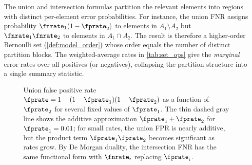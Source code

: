 \begin{remark}
\label{rem:composed_order}
The union and intersection formulas partition the relevant elements into regions with distinct per-element error probabilities.
For instance, the union FNR assigns probability $\fnrate_1(1-\fprate_2)$ to elements in $A_1 \setminus A_2$ but $\fnrate_1 \fnrate_2$ to elements in $A_1 \cap A_2$.
The result is therefore a higher-order Bernoulli set (\cref{def:model_order}) whose order equals the number of distinct partition blocks.
The weighted-average rates in \cref{tab:set_ops} give the \emph{marginal} error rates over all positives (or negatives), collapsing the partition structure into a single summary statistic.
\end{remark}

\begin{figure}[ht]
\centering
{}
\caption{Union false positive rate
$\fprate = 1 - (1-\fprate_1)(1-\fprate_2)$ as a function of $\fprate_2$
for several fixed values of $\fprate_1$.
The thin dashed gray line shows the additive approximation
$\fprate_1 + \fprate_2$ for $\fprate_1 = 0.01$;
for small rates, the union FPR is nearly additive, but the
product term $\fprate_1 \fprate_2$ becomes significant as rates grow.
By De Morgan duality, the intersection FNR has the same functional form
with $\fnrate_i$ replacing $\fprate_i$.}
\label{fig:union_fpr}
\end{figure}

